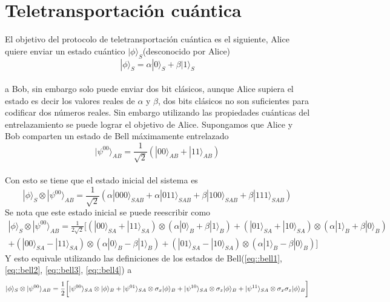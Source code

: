 \documentclass[a4paper]{article}
\begin{document}
\section{Teletransportación cuántica}
El objetivo del protocolo de teletransportación cuántica es el siguiente, Alice quiere enviar un estado cuántico $|\phi\rangle_S$(desconocido por Alice)
\begin{equation}
|\phi\rangle_S=\alpha|0\rangle_S+\beta|1\rangle_S
\end{equation}\\
a Bob, sin embargo solo puede enviar dos bit clásicos, aunque Alice supiera el estado es decir los valores reales de $\alpha$ y $\beta$, dos bits clásicos no son suficientes para codificar dos números reales. Sin embargo utilizando las propiedades cuánticas del entrelazamiento se puede lograr el objetivo de Alice.
Supongamos que Alice y Bob comparten un estado de Bell máximamente entrelazado 
\begin{equation}
|\psi^{00}\rangle_{AB}=\frac{1}{\sqrt{2}}(|00\rangle_{AB}+|11\rangle_{AB})
\end{equation}\\
Con esto se tiene que el estado inicial del sistema es 
\begin{equation}
|\phi\rangle_S\otimes |\psi^{00}\rangle_{AB}=\frac{1}{\sqrt{2}}(\alpha|000\rangle_{SAB}+\alpha|011\rangle_{SAB}+\beta|100\rangle_{SAB}+\beta|111\rangle_{SAB})
\end{equation}
Se nota que este estado inicial se puede reescribir como
\begin{equation}
\begin{split}
|\phi\rangle_S\otimes |\psi^{00}\rangle_{AB}=\frac{1}{2\sqrt{2}}\bigg[ (|00\rangle_{SA}+|11\rangle_{SA})\otimes(\alpha|0\rangle_B+\beta|1\rangle_B)+(|01\rangle_{SA}+|10\rangle_{SA})\otimes(\alpha|1\rangle_B+\beta|0\rangle_B) \\
+(|00\rangle_{SA}-|11\rangle_{SA})\otimes(\alpha|0\rangle_B-\beta|1\rangle_B)+(|01\rangle_{SA}-|10\rangle_{SA})\otimes(\alpha|1\rangle_B-\beta|0\rangle_B)\bigg]
\end{split}
\end{equation}
Y esto equivale utilizando las definiciones de los estados de Bell(\ref{eq::bell1}, \ref{eq::bell2}, \ref{eq::bell3}, \ref{eq::bell4}) a 
\begin{equation}
|\phi\rangle_S\otimes |\psi^{00}\rangle_{\small{AB}}=\frac{1}{2}\bigg[|\psi^{00}\rangle_{SA}\otimes|\phi\rangle_B+|\psi^{01}\rangle_{SA}\otimes\sigma_x|\phi\rangle_B +|\psi^{10}\rangle_{SA}\otimes\sigma_z|\phi\rangle_B+|\psi^{11}\rangle_{SA}\otimes\sigma_x\sigma_z|\phi\rangle_B \bigg]
\end{equation}\\
\end{document}
